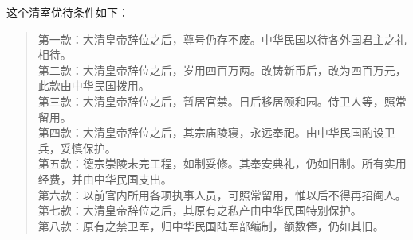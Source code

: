 这个清室优待条件如下：\\

\begin{quote}
	第一款：大清皇帝辞位之后，尊号仍存不废。中华民国以待各外国君主之礼相待。\\

第二款：大清皇帝辞位之后，岁用四百万两。改铸新币后，改为四百万元，此款由中华民国拨用。\\

第三款：大清皇帝辞位之后，暂居官禁。日后移居颐和园。侍卫人等，照常留用。\\

第四款：大清皇帝辞位之后，其宗庙陵寝，永远奉祀。由中华民国酌设卫兵，妥慎保护。\\

第五款：德宗崇陵未完工程，如制妥修。其奉安典礼，仍如旧制。所有实用经费，并由中华民国支出。\\

第六款：以前官内所用各项执事人员，可照常留用，惟以后不得再招阉人。\\

第七款：大清皇帝辞位之后，其原有之私产由中华民国特别保护。\\

第八款：原有之禁卫军，归中华民国陆军部编制，额数俸，仍如其旧。\\
\end{quote}
